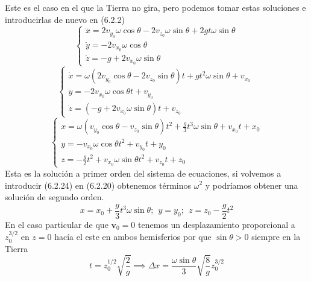 Este es el caso en el que la Tierra no gira, pero podemos tomar estas soluciones e introducirlas de nuevo en (6.2.2)
\begin{equation} \label{6.1.1}
    \left\{\begin{matrix}
      \ddot{x} = 2 v_{y_0} \omega\cos\theta -2 v_{z_0}\omega\sin\theta + 2 gt \omega\sin\theta\\
      \ddot{y} = -2 v_{x_0} \omega \cos\theta \phantom{----------,,}\\
      \ddot{z} = -g +2 v_{x_0} \omega \sin\theta \phantom{---------}
    \end{matrix}\right. 
\end{equation} 
\begin{equation} \label{6.1.1}
    \left\{\begin{matrix}
      \dot{x} = \omega\left(2 v_{y_0} \cos\theta -2 v_{z_0}\sin\theta\right)t +  gt^2 \omega\sin\theta + v_{x_0}\\
      \dot{y} = -2 v_{x_0} \omega \cos\theta t + v_{y_0} \phantom{-----------,}\\
      \dot{z} = \left(-g +2 v_{x_0} \omega \sin\theta\right)t + v_{z_0} \phantom{--------,,}
    \end{matrix}\right. 
\end{equation} 
\begin{equation} \label{6.1.1}
    \left\{\begin{matrix}
        x = \omega\left( v_{y_0} \cos\theta - v_{z_0}\sin\theta\right)t^2 +  \frac{g}{3}t^3 \omega\sin\theta + v_{x_0}t + x_0\\
        y = -v_{x_0} \omega \cos\theta t^2 + v_{y_0}t + y_0 \phantom{-----------}\\
        z = -\frac{g}{2}t^2 + v_{x_0} \omega \sin\theta t^2 + v_{z_0}t+z_0 \phantom{--------,,}
    \end{matrix}\right. 
\end{equation} 
Esta es la solución a primer orden del sistema de ecuaciones, si volvemos a introducir (6.2.24) en (6.2.20) obtenemos términos $\omega^2$ y podríamos obtener una solución de segundo orden.
\begin{equation} \label{6.1.1}
    x =  x_0 + \frac{g}{3}t^3 \omega\sin\theta; \ \ y = y_0; \ \ z =z_0-\frac{g}{2}t^2 
\end{equation} 
En el caso particular de que $\mathbf{v}_0 = 0$ tenemos un desplazamiento proporcional a $z_0^{3/2}$ en $z=0$ hacía el este en ambos hemisferios por que $\sin\theta >0$ siempre en la Tierra 
\begin{equation} \label{6.1.1}
    t = z_0^{1/2} \sqrt{\frac{2}{g}} \implies \Delta x = \frac{ \omega \sin\theta}{3} \sqrt{\frac{8}{g}} z_0^{3/2}
\end{equation} 
\vspace{-15pt}
